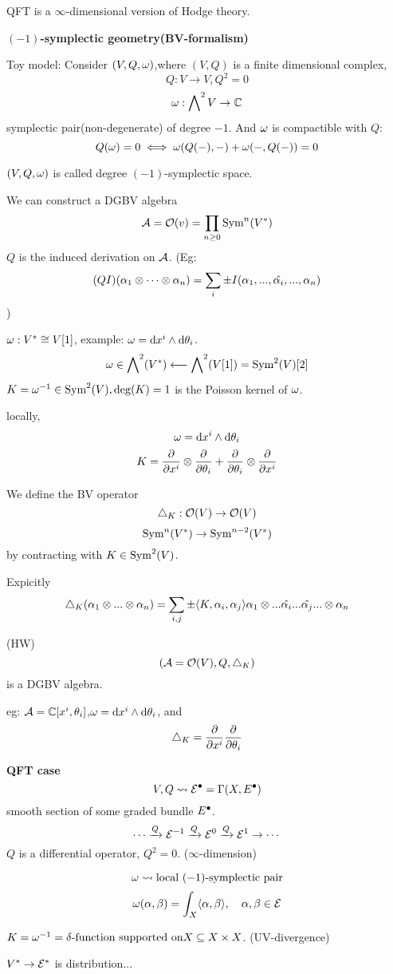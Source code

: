 QFT is a $\infty$-dimensional version of Hodge theory.

\textbf{$(-1)$-symplectic geometry(BV-formalism)}

Toy model:
Consider $(V,Q,\omega)$,where $(V,Q)$ is a finite dimensional complex,
$$Q:V\to V,Q^2=0$$
$$\omega:\bigwedge\nolimits^{2}V\to\mathbb{C}$$
symplectic pair(non-degenerate) of degree $-1$.
And $\omega$ is compactible with $Q$:
$$Q(\omega)=0\iff
\omega(Q(-),-)+\omega(-,Q(-))=0$$

$(V,Q,\omega)$ is called degree $(-1)$-symplectic space.

We can construct a DGBV algebra
$$\mathcal{A}=\mathcal{O}(v)=\prod_{n\geq 0}\operatorname{Sym}^n(V^*)$$
$Q$ is the induced derivation on $\mathcal{A}$.
(Eg:
$$(QI)(\alpha_1\otimes\cdots\otimes\alpha_n)=
\sum_i\pm I(\alpha_1,...,\hat{\alpha_i},...,\alpha_n)$$
)

$\omega:V^*\cong V[1]$, example:
$\omega=\mathrm{d} x^i\wedge\mathrm{d}\theta_i$.
$$\omega\in\bigwedge\nolimits^{2}(V^*)\longleftarrow \bigwedge\nolimits^{2}(V[1])=\operatorname{Sym}^2(V)[2]$$
$K=\omega^{-1}\in\operatorname{Sym}^2(V),\deg(K)=1$ is the Poisson kernel of $\omega$.

locally,
$$\omega=\mathrm{d} x^i\wedge\mathrm{d}\theta_i$$
$$K=\frac{\partial } {\partial x^i}\otimes\frac{\partial } {\partial \theta_i}+\frac{\partial } {\partial \theta_i}\otimes\frac{\partial } {\partial x^i}$$

We define the BV operator
$$\triangle_K:\mathcal{O}(V)\to\mathcal{O}(V)$$
$$\operatorname{Sym}^n(V^*)\to\operatorname{Sym}^{n-2}(V^*)$$
by contracting with $K\in\operatorname{Sym}^2(V)$.

Expicitly
$$\triangle_K(\alpha_1\otimes...\otimes\alpha_n)
=\sum_{i,j}\pm\langle K,\alpha_i,\alpha_j\rangle\alpha_1\otimes...\hat{\alpha_i}...\hat{\alpha_j}...\otimes\alpha_n$$

\begin{prop}(HW)
$$(\mathcal{A}=\mathcal{O}(V),Q,\triangle_K)$$
is a DGBV algebra.
\end{prop}

eg: $\mathcal{A}=\mathbb{C}[x^i,\theta_i]$,$\omega=\mathrm{d} x^i\wedge\mathrm{d}\theta_i$, and
$$\triangle_K=\frac{\partial } {\partial x^i}\frac{\partial } {\partial \theta_i}$$

\textbf{QFT case}
$$V,Q\rightsquigarrow
\mathcal{E}^{\bullet}=\Gamma(X,E^{\bullet})$$
smooth section of some graded bundle $E^{\bullet}$.
$$\cdots\xrightarrow{Q}\mathcal{E}^{-1}\xrightarrow{Q}\mathcal{E}^0\xrightarrow{Q}\mathcal{E}^1\to\cdots$$
$Q$ is a differential operator, $Q^2=0$. ($\infty$-dimension)

$$\omega\rightsquigarrow\text{local $(-1)$-symplectic pair}$$
$$\omega(\alpha,\beta)=\int_X\langle\alpha,\beta\rangle,\quad\alpha,\beta\in\mathcal{E}$$

$K=\omega^{-1}=\delta\text{-function supported on} X\subseteq X\times X$.
(UV-divergence)

$V^*\to\mathcal{E}^*$ is distribution...


